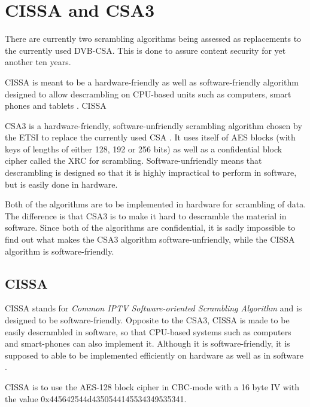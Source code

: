\chapter{CISSA and CSA3}
There are currently two scrambling algorithms being assessed as replacements to 
the currently used DVB-CSA. This is done to assure content security for 
yet another ten years.


CISSA is meant to be a hardware-friendly as well as software-friendly algorithm 
designed to allow descrambling on CPU-based units such as computers, smart phones
and tablets \citep[p. 9]{DVB:2013}. CISSA 

CSA3 is a hardware-friendly, software-unfriendly scrambling algorithm chosen by 
the ETSI to replace the currently used CSA \citep[pp. 6--7]{DVB:2013}. It uses 
itself of AES blocks (with keys of lengths of either 128, 192 or 256 bits) as 
well as a confidential block cipher called the XRC for scrambling. 
Software-unfriendly means that descrambling is designed so that it is highly 
impractical to perform in software, but is easily done in hardware.

Both of the algorithms are to be implemented in hardware for scrambling of data.
The difference is that CSA3 is to make it hard to descramble the material in 
software. Since both of the algorithms are confidential, it is sadly impossible 
to find out what makes the CSA3 algorithm software-unfriendly, while the CISSA 
algorithm is software-friendly. 

\section{CISSA}
CISSA stands for \emph{Common IPTV Software-oriented Scrambling Algorithm} and 
is designed to be software-friendly. Opposite to the CSA3, CISSA is made to be 
easily descrambled in software, so that CPU-based systems such as computers and 
smart-phones can also implement it.  Although it is software-friendly, it is 
supposed to able to be implemented efficiently on hardware as well as in 
software \citep[p. 9]{DVB:2013}.

CISSA is to use the AES-128 block cipher in CBC-mode with a 16 byte IV with the 
value 0x445642544d4350544145534349535341. \citep[p. 11]{DVB:2013}

